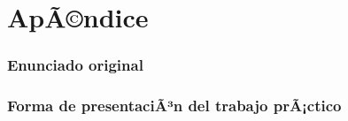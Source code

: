 \documentclass[a4paper,11pt]{article}
\begin{document}



\clearpage

\part{ApÃ©ndice}
\appendix

\section{Enunciado original}\label{sec:enunciado}


\clearpage

\section{\textbf{Forma de presentaciÃ³n del trabajo prÃ¡ctico}}
\end{document}
